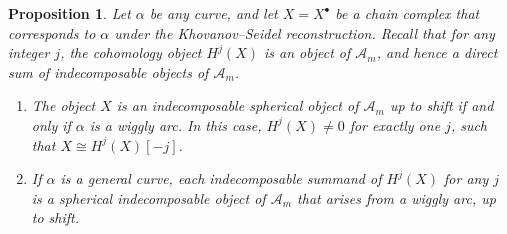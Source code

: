 \documentclass{amsart}
\newtheorem{proposition}[theorem]{Proposition}
\theoremstyle{definition}
\begin{document}
\begin{proposition}\label{prop:cohomology-pieces}
  Let \(\alpha\) be any curve, and let \(X = X^{\bullet}\) be a chain complex that corresponds to \(\alpha\) under the Khovanov--Seidel reconstruction.
  Recall that for any integer \(j\), the cohomology object \(H^j(X)\) is an object of \(\mathcal{A}_m\), and hence a direct sum of indecomposable objects of \(\mathcal{A}_m\).
  \begin{enumerate}
  \item The object \(X\) is an indecomposable spherical object of \(\mathcal{A}_m\) up to shift if and only if \(\alpha\) is a wiggly arc.
    In this case, \(H^j(X) \neq 0\) for exactly one \(j\), such that \(X \cong H^j(X)[-j]\).
  \item If \(\alpha\) is a general curve, each indecomposable summand of \(H^j(X)\) for any \(j\) is a spherical indecomposable object of \(\mathcal{A}_m\) that arises from a wiggly arc, up to shift.
  \end{enumerate}
\end{proposition}
\end{document}
